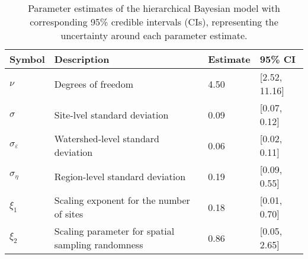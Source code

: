 \begin{table}[ht]
\centering
\caption{Parameter estimates of the hierarchical Bayesian model 
             with corresponding 95\% credible intervals (CIs), 
             representing the uncertainty around each parameter estimate.
             \label{tab:parms-est}} 
\begingroup\small
\begin{tabularx}{\textwidth}{llll}
  \hline
Symbol & Description & Estimate & 95\% CI \\ 
  \hline
$\nu$ & Degrees of freedom & 4.50 & [2.52, 11.16] \\ 
  $\sigma$ & Site-lvel standard deviation & 0.09 & [0.07, 0.12] \\ 
  $\sigma_{\varepsilon}$ & Watershed-level standard deviation & 0.06 & [0.02, 0.11] \\ 
  $\sigma_{\eta}$ & Region-level standard deviation & 0.19 & [0.09, 0.55] \\ 
  $\xi_{1}$ & Scaling exponent for the number of sites & 0.18 & [0.01, 0.70] \\ 
  $\xi_{2}$ & Scaling parameter for spatial sampling randomness & 0.86 & [0.05, 2.65] \\ 
   \hline
\end{tabularx}
\endgroup
\end{table}

